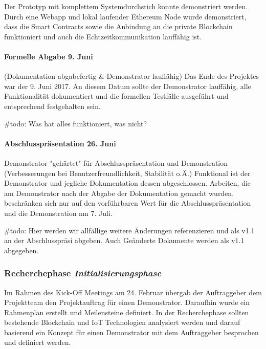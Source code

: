 Der Prototyp mit komplettem Systemdurchstich konnte demonstriert werden. Durch eine Webapp und lokal laufender Ethereum Node wurde demonstriert, dass die Smart Contracts sowie die Anbindung an die private Blockchain funktioniert und auch die Echtzeitkommunikation lauffähig ist.

\paragraph{Formelle Abgabe 9. Juni}
(Dokumentation abgabefertig \& Demonstrator lauffähig) Das Ende des Projektes war der 9. Juni 2017. An diesem Datum sollte der Demonstrator lauffähig, alle Funktionalität dokumentiert und die formellen Testfälle ausgeführt und entsprechend festgehalten sein. 

\#todo: Was hat alles funktioniert, was nicht?

\paragraph{Abschlusspräsentation 26. Juni}
Demonstrator "gehärtet" für Abschlusspräsentation und Demonstration (Verbesserungen bei Benutzerfreundlichkeit, Stabilität o.Ä.)
Funktional ist der Demonstrator und jegliche Dokumentation dessen abgeschlossen. Arbeiten, die am Demonstrator nach der Abgabe der Dokumentation gemacht wurden, beschränken sich nur auf den vorführbaren Wert für die Abschlusspräsentation und die Demonstration am 7. Juli.

\#todo: Hier werden wir allfällige weitere Änderungen referenzieren und als v1.1 an der Abschlusspräsi abgeben. Auch Geänderte Dokumente werden als v1.1 abgegeben.

\subsubsection{Recherchephase \emph{Initialisierungsphase}}
Im Rahmen des Kick-Off Meetings am 24. Februar übergab der Auftraggeber dem Projektteam den Projektauftrag für einen Demonstrator. Daraufhin wurde ein Rahmenplan erstellt und Meilensteine definiert. In der Recherchephase sollten bestehende Blockchain und IoT Technologien analysiert werden und darauf basierend ein Konzept für einen Demonstrator mit dem Auftraggeber besprochen und definiert werden.

